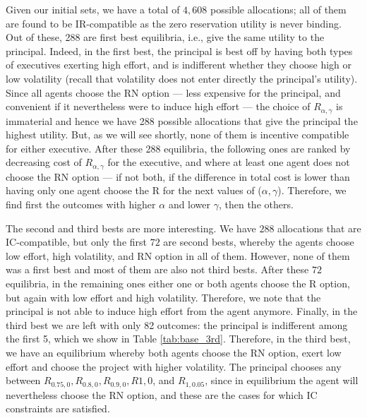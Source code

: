 Given our initial sets, we have a total of $4,608$ possible allocations; all of them are found to be IR-compatible as the zero reservation utility is never binding. Out of these, 288 are first best equilibria, i.e., give the same utility to the principal. Indeed, in the first best, the principal is best off by having both types of executives exerting high effort, and is indifferent whether they choose high or low volatility (recall that volatility does not enter directly the principal's utility). Since all agents choose the RN option --- less expensive for the principal, and convenient if it nevertheless were to induce high effort --- the choice of $R_{\alpha, \gamma}$ is immaterial and hence we have 288 possible allocations that give the principal the highest utility. But, as we will see shortly, none of them is incentive compatible for either executive. After these 288 equilibria, the following ones are ranked by decreasing cost of $R_{\alpha, \gamma}$ for the executive, and where at least one agent does not choose the RN option --- if not both, if the difference in total cost is lower than having only one agent choose the R for the next values of ($\alpha, \gamma$). Therefore, we find first the outcomes with higher $\alpha$ and lower $\gamma$, then the others.



The second and third bests are more interesting. We have $288$ allocations that are IC-compatible, but only the first $72$ are second bests, whereby the agents choose low effort, high volatility, and RN option in all of them. However, none of them was a first best and most of them are also not third bests. After these $72$ equilibria, in the remaining ones either one or both agents choose the R option, but again with low effort and high volatility. Therefore, we note that the principal is not able to induce high effort from the agent anymore. Finally, in the third best we are left with only 82 outcomes: the principal is indifferent among the first 5, which we show in Table \ref*{tab:base_3rd}. Therefore, in the third best, we have an equilibrium whereby both agents choose the RN option, exert low effort and choose the project with higher volatility. The principal chooses any between $R_{0.75, 0}, R_{0.8, 0}, R_{0.9, 0}, R{1, 0}$, and $R_{1, 0.05}$, since in equilibrium the agent will nevertheless choose the RN option, and these are the cases for which IC constraints are satisfied.



